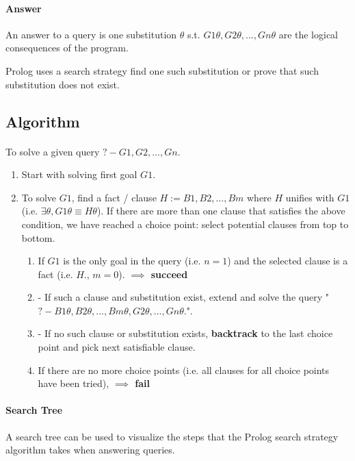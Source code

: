 \documentclass{article}
\begin{document}
\begin{multicols}{2}
  \paragraph{Answer} An answer to a query is one substitution $\theta$ s.t. $G1\theta, G2\theta, ..., Gn\theta$ are the logical consequences of the program.
  
  Prolog uses a search strategy find one such substitution or prove that such substitution does not exist.
  
  \subsection{Algorithm}
  
  \paragraph{} To solve a given query $?- G1, G2, ..., Gn.$
  
  \begin{enumerate}
  \item Start with solving first goal $G1$.
  \item To solve $G1$, find a fact / clause $H := B1, B2, ..., Bm$ where $H$ unifies with $G1$ (i.e. $\exists\theta, G1\theta \equiv H\theta$). If there are more than one clause that satisfies the above condition, we have reached a choice point: select potential clauses from top to bottom. 
  \begin{enumerate}
  \item If $G1$ is the only goal in the query (i.e. $n=1$) and the selected clause is a fact (i.e. $H.$, $m=0$). {\bf $\implies$ succeed}
  \item - If such a clause and substitution exist, extend and solve the query "$?- B1\theta, B2\theta, ..., Bm\theta, G2\theta, ..., Gn\theta.$".
  \item - If no such clause or substitution exists, {\bf backtrack} to the last choice point and pick next satisfiable clause.
  \item If there are no more choice points (i.e. all clauses for all choice points have been tried), {\bf $\implies$ fail}
  \end{enumerate}
  \end{enumerate}
  
  \paragraph{Search Tree} A search tree can be used to visualize the steps that the Prolog search strategy algorithm takes when answering queries.
  

\end{multicols}
\end{document}
